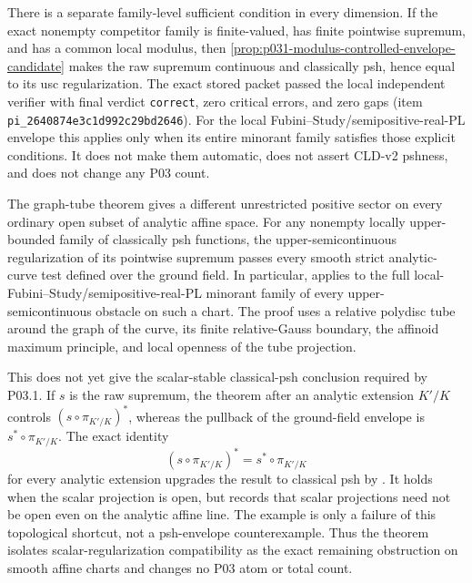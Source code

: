 There is a separate family-level sufficient condition in every dimension.
If the exact nonempty competitor family is finite-valued, has finite
pointwise supremum, and has a common local modulus, then
\cref{prop:p031-modulus-controlled-envelope-candidate} makes the raw
supremum continuous and classically psh, hence equal to its usc
regularization.  The exact stored packet passed the local independent
verifier with final verdict \texttt{correct}, zero critical errors, and zero
gaps (item \texttt{pi\_2640874e3c1d992c29bd2646}).  For the local
Fubini--Study/semipositive-real-PL envelope this applies only when its
entire minorant family satisfies those explicit conditions.  It does not
make them automatic, does not assert CLD-v2 pshness, and does not change any
P03 count.

The graph-tube theorem
 gives a different unrestricted
positive sector on every ordinary open subset of analytic affine space.
For any nonempty locally upper-bounded family of classically psh functions,
the upper-semicontinuous regularization of its pointwise supremum passes
every smooth strict analytic-curve test defined over the ground field.  In
particular,  applies to the full
local-Fubini--Study/semipositive-real-PL minorant family of every
upper-semicontinuous obstacle on such a chart.  The proof uses a relative
polydisc tube around the graph of the curve, its finite relative-Gauss
boundary, the affinoid maximum principle, and local openness of the tube
projection.

This does not yet give the scalar-stable classical-psh conclusion required
by P03.1.  If \(s\) is the raw supremum, the theorem after an analytic
extension \(K'/K\) controls \((s\circ\pi_{K'/K})^*\), whereas the pullback of
the ground-field envelope is \(s^*\circ\pi_{K'/K}\).  The exact identity
\[
                    (s\circ\pi_{K'/K})^*
                         =s^*\circ\pi_{K'/K}
\]
for every analytic extension upgrades the result to classical psh by
.  It holds when the scalar
projection is open, but
 records that scalar projections
need not be open even on the analytic affine line.  The example is only a
failure of this topological shortcut, not a psh-envelope counterexample.
Thus the theorem isolates scalar-regularization compatibility as the exact
remaining obstruction on smooth affine charts and changes no P03 atom or
total count.

